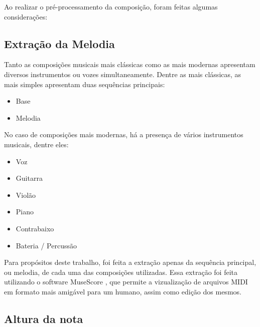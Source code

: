 Ao realizar o pré-processamento da composição, foram feitas algumas considerações:

\subsection{Extração da Melodia}

Tanto as composições musicais mais clássicas como as mais modernas apresentam diversos instrumentos ou vozes simultaneamente. Dentre as mais clássicas, as mais simples apresentam duas sequências principais:

\begin{itemize}
    \item Base
    \item Melodia
\end{itemize}

No caso de composições mais modernas, há a presença de vários instrumentos musicais, dentre eles:

\begin{itemize}
    \item Voz
    \item Guitarra
    \item Violão
    \item Piano
    \item Contrabaixo
    \item Bateria / Percussão
\end{itemize}

Para propósitos deste trabalho, foi feita a extração apenas da sequência principal, ou melodia, de cada uma das composições utilizadas. Essa extração foi feita utilizando o software MuseScore \cite{musescore}, que permite a vizualização de arquivos MIDI em formato mais amigável para um humano, assim como edição dos mesmos.



\subsection{Altura da nota}\label{section:altura_da_nota}

